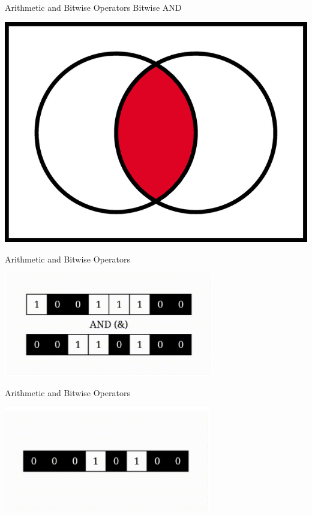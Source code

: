 \documentclass{beamer}
\begin{document}
    \begin{frame}{Arithmetic and Bitwise Operators}
        \color{blue} \Large Bitwise AND \\
        \color{black} \normalsize \vskip 10pt
        \begin{center}
            \includegraphics[scale = 0.7]{AND.png}
        \end{center}
    \end{frame}
    
    \begin{frame}{Arithmetic and Bitwise Operators}
        \begin{center}
            \includegraphics[scale = 0.8]{AND Before.png}
        \end{center}
    \end{frame}
    
    \begin{frame}{Arithmetic and Bitwise Operators}
        \begin{center}
            \includegraphics[scale = 0.8]{AND After.png}
        \end{center}
    \end{frame}
    
\end{document}
